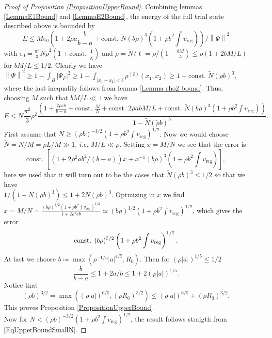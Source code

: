 \documentclass[a4paper,11pt]{article}
\newcommand{\norm}[1]{\left\lVert #1 \right\rVert}
\newcommand{\abs}[1]{\left\lvert #1 \right\rvert}
\newcommand{\ie}{\emph{i.e.} }
\numberwithin{equation}{section}
\begin{document}
	\begin{proof}[Proof of Proposition \ref{PropositionUpperBound}]
	Combining lemmas \ref{LemmaE1Bound} and \ref{LemmaE2Bound}, the energy of the full trial state described above is bounded by \begin{equation}\label{EqUpperBoundSmallN}
	E\leq M e_0\left(1+2\tilde{\rho} a\frac{b}{b-a} + \text{const. } \tilde{N} (b\tilde{\rho})^3\left(1+\rho b^2\int v_{\text{reg}}\right)\right)/\norm{\Psi}^2
	\end{equation}
	with $ e_0=\frac{\pi^2}{3}\tilde{N}\tilde{\rho}^2(1+\text{const. }\frac{1}{\tilde{N}}) $ and $ \tilde{\rho}=\tilde{N}/\ell=\rho/(1-\frac{bM}{L})\leq \rho(1+2bM/L) $ for $ bM/L\leq 1/2 $. Clearly we have $ \norm{\Psi}^2\geq 1-\int_B\abs{\Psi_F}^2\geq 1-\int_{\abs{x_1-x_2}<b}\rho^{(2)}(x_1,x_2)\geq 1-\text{const. }\tilde{N}(\rho b)^3 $, where the last inequality follows from lemma \ref{Lemma rho2 bound}.
	Thus, choosing $ M $ such that $ bM/L\ll 1 $ we have \begin{equation}
	E\leq N\frac{\pi^2}{3}\rho^2\frac{\left(1+\frac{2\rho ab}{b-a}+\text{const. }\frac{M}{N}+\text{const. }2\rho abM/L+\text{const. }\tilde{N}(b\rho)^3\left(1+\rho b^2\int v_{\text{reg}}\right)\right)}{1-\tilde{N}(\tilde{\rho} b)^3}.
	\end{equation}
	First assume that $ N\geq (\rho b)^{-3/2}\left(1+\rho b^2\int v_{\text{reg}}\right)^{1/2} $. Now we would choose $ \tilde{N}=N/M=\rho L/M\gg 1 $, \ie $ M/L\ll \rho $. Setting $ x=M/N $ we see that the error is \begin{equation}
	\text{const. }\left[(1+2\rho^2 ab^2/(b-a))x+x^{-1}(b\rho)^3\left(1+\rho b^2\int v_{\text{reg}}\right)\right],
	\end{equation}
	here we used that it will turn out to be the cases that $ \tilde{N}(\rho b)^3\leq 1/2 $ so that we have\\ $ 1/(1-\tilde{N}(\rho b)^3)\leq 1+2\tilde{N}(\rho b)^3 $.
	Optmizing in $ x $ we find $ x=M/N=\frac{(b\rho)^{3/2}\left(1+\rho b^2\int v_{\text{reg}}\right)^{1/2}}{1+2\rho^2 a b}\simeq(b\rho)^{3/2}\left(1+\rho b^2\int v_{\text{reg}}\right)^{1/2} $, which gives the error \begin{equation}
	\text{const. }(b\rho)^{3/2}\left(1+\rho b^2 \int v_{\textnormal{reg}}\right)^{1/2}.
	\end{equation}
	At last we choose $ b\coloneqq\max(\rho^{-1/5}\abs{a}^{4/5},R_0) $. Then for $(\rho \abs{a})^{1/5}\leq 1/2$ $$ \frac{b}{b-a}\leq1+2a/b\leq  1+2(\rho\abs{a})^{1/5}. $$
	Notice that $$ (\rho b)^{3/2}= \max\left((\rho \abs{a})^{6/5},(\rho R_0)^{3/2}\right)\leq  (\rho \abs{a})^{6/5}+(\rho R_0)^{3/2}. $$
	This proves Proposition \ref{PropositionUpperBound}.\\
	Now for $ N<(\rho b)^{-3/2}\left(1+\rho b^2\int v_{\text{reg}}\right)^{1/2} $, the result follows straigth from \eqref{EqUpperBoundSmallN}.
\end{proof}
\end{document}
